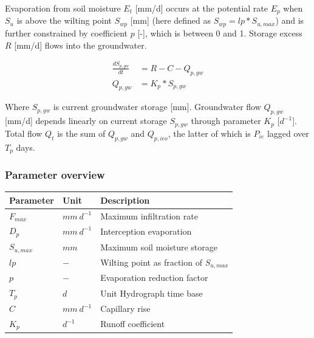 \noindent Evaporation from soil moisture $E_t$ [mm/d] occurs at the potential rate $E_p$ when $S_u$ is above the wilting point $S_{wp}$ [mm] (here defined as $S_{wp} = lp*S_{u,max}$) and is further constrained by coefficient $p$ [-], which is between 0 and 1. Storage excess $R$ [mm/d] flows into the groundwater. 

\begin{align}
	\frac{dS_{p,gw}}{dt} &=R-C-Q_{p,gw} \\
	Q_{p,gw} &= K_p*S_{p,gw}
\end{align}

Where $S_{p,gw}$ is current groundwater storage [mm]. Groundwater flow $Q_{p,gw}$ [mm/d] depends linearly on current storage $S_{p,gw}$ through parameter $K_p$ [$d^{-1}$]. Total flow $Q_t$ is the sum of $Q_{p,gw}$ and $Q_{p,ieo}$, the latter of which is $P_{ie}$ lagged over $T_p$ days.

\subsubsection{Parameter overview}
\begin{table}[htbp]
  \centering
    \begin{tabular}{lll}
    \toprule
    Parameter & Unit  & Description \\
    \midrule
    $F_{max}$ & $mm~d^{-1}$ & Maximum infiltration rate \\
    $D_p$ & $mm~d^{-1}$ & Interception evaporation  \\
    $S_{u,max}$ & $mm$  & Maximum soil moisture storage \\
    $lp$  & $-$   & Wilting point as fraction of $S_{u,max}$ \\
    $p$   & $-$   & Evaporation reduction factor \\
    $T_p$ & $d$   & Unit Hydrograph time base \\
    $C$   & $mm~d^{-1}$ & Capillary rise \\
    $K_p$ & $d^{-1}$ & Runoff coefficient \\
    \bottomrule
    \end{tabular}%
  \label{tab:addlabel}%
\end{table}%


